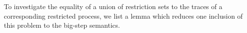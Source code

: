 
To investigate the equality of a union of restriction sets to the traces of a corresponding restricted process, we list a lemma which reduces one inclusion of this problem to the big-step semantics.

